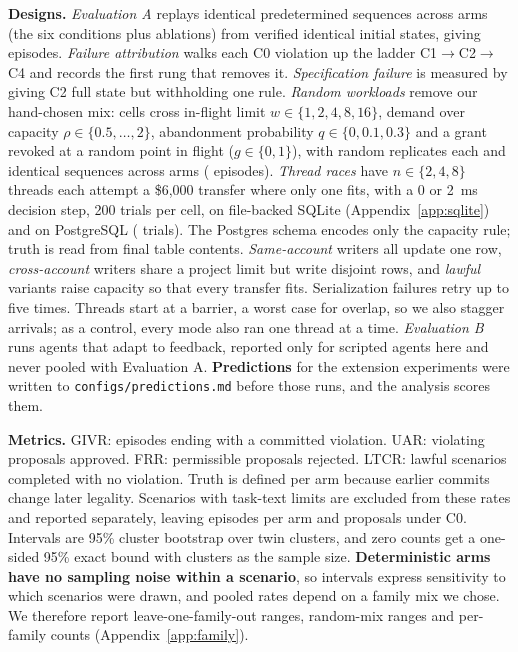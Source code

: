 \documentclass[10pt]{article}
\begin{document}
\textbf{Designs.} \emph{Evaluation A} replays identical predetermined sequences across \nArms{} arms (the six conditions plus ablations) from verified identical initial states, giving \nEpisodes{} episodes. \emph{Failure attribution} walks each C0 violation up the ladder C1$\to$C2$\to$C4 and records the first rung that removes it. \emph{Specification failure} is measured by giving C2 full state but withholding one rule. \emph{Random workloads} remove our hand-chosen mix: \wlCells{} cells cross in-flight limit $w\in\{1,2,4,8,16\}$, demand over capacity $\rho\in\{0.5,\dots,2\}$, abandonment probability $q\in\{0,0.1,0.3\}$ and a grant revoked at a random point in flight ($g\in\{0,1\}$), with \wlReps{} random replicates each and identical sequences across arms (\wlEpisodes{} episodes). \emph{Thread races} have $n\in\{2,4,8\}$ threads each attempt a \$6,000 transfer where only one fits, with a 0 or 2~ms decision step, 200 trials per cell, on file-backed SQLite (Appendix~\ref{app:sqlite}) and on PostgreSQL \pgVersion{} (\pgTrials{} trials). The Postgres schema encodes only the capacity rule; truth is read from final table contents. \emph{Same-account} writers all update one row, \emph{cross-account} writers share a project limit but write disjoint rows, and \emph{lawful} variants raise capacity so that every transfer fits. Serialization failures retry up to five times. Threads start at a barrier, a worst case for overlap, so we also stagger arrivals; as a control, every mode also ran one thread at a time. \emph{Evaluation B} runs agents that adapt to feedback, reported only for scripted agents here and never pooled with Evaluation A. \textbf{Predictions} for the extension experiments were written to \texttt{configs/predictions.md} before those runs, and the analysis scores them.

\textbf{Metrics.} GIVR: episodes ending with a committed violation. UAR: violating proposals approved. FRR: permissible proposals rejected. LTCR: lawful scenarios completed with no violation. Truth is defined per arm because earlier commits change later legality. Scenarios with task-text limits are excluded from these rates and reported separately, leaving \nInvariantScenarios{} episodes per arm and \nProposals{} proposals under C0. Intervals are 95\% cluster bootstrap over twin clusters, and zero counts get a one-sided 95\% exact bound with clusters as the sample size. \textbf{Deterministic arms have no sampling noise within a scenario}, so intervals express sensitivity to which scenarios were drawn, and pooled rates depend on a family mix we chose. We therefore report leave-one-family-out ranges, random-mix ranges and per-family counts (Appendix~\ref{app:family}).
\end{document}
